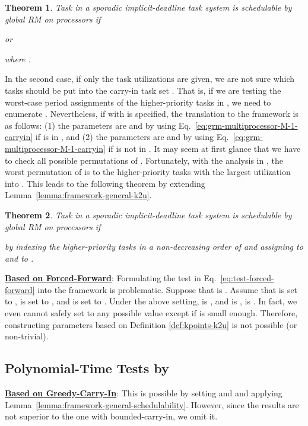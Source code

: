 \documentclass[10pt,conference]{IEEEtran}
\newcommand{\frameworkkq}[1]{}
\newcommand{\frameworkku}[1]{}
\newtheorem{theorem}{Theorem}
\begin{document}
\begin{theorem}
\label{thm:multiprocessor-GRM-M-1-V0}
Task  in a sporadic implicit-deadline task system is
schedulable by global RM on  processors if

or

where .
\end{theorem}

In the second case, if only the task utilizations are given, we are not sure which tasks
should be put into the carry-in task set . That is, if we
are testing the worst-case period assignments of the higher-priority
tasks in , we need to enumerate .  Nevertheless,
if  with  is specified, the translation to
the \frameworkku{} framework is as follows: (1) the parameters are  and  by
using Eq.~\eqref{eq:grm-multiprocessor-M-1-carryin} if  is in
, and (2) the parameters are  and  by using
Eq.~\eqref{eq:grm-multiprocessor-M-1-carryin} if  is not in
. It may seem at first glance that we have to check all
possible permutations of . Fortunately, with the analysis in
\cite{DBLP:journals/corr/abs-1501.07084,DBLP:conf/rtss/ChenHL15}, the worst permutation of
 is to the  higher-priority tasks with the largest
utilization into . This leads to the following theorem by
extending Lemma~\ref{lemma:framework-general-k2u}.

\begin{theorem}
\label{thm:multiprocessor-GRM-M-1-carry}
Task  in a sporadic implicit-deadline task system is
schedulable by global RM on  processors if

by indexing the  higher-priority tasks in a non-decreasing order of  and assigning  to  and  to .
\end{theorem}

\noindent\underline{\bf Based on Forced-Forward}:
Formulating the test in Eq.~\eqref{eq:test-forced-forward} into the
\frameworkku{} framework is problematic. Suppose that  is
. Assume that  is set to ,  is set to ,
and  is set to . Under the above setting,  is ,
and  is ,  is . In fact, we even cannot
safely set  to any possible value except  if  is
small enough. Therefore, constructing parameters based on Definition
\ref{def:kpoints-k2u} is not possible (or non-trivial).


\subsection{Polynomial-Time Tests by \frameworkkq{}}

\noindent\underline{\bf Based on Greedy-Carry-In}: This is
possible by setting  and 
and applying
Lemma~\ref{lemma:framework-general-schedulability}. However, since the
results are not superior to the one with bounded-carry-in, we omit it.
\end{document}

